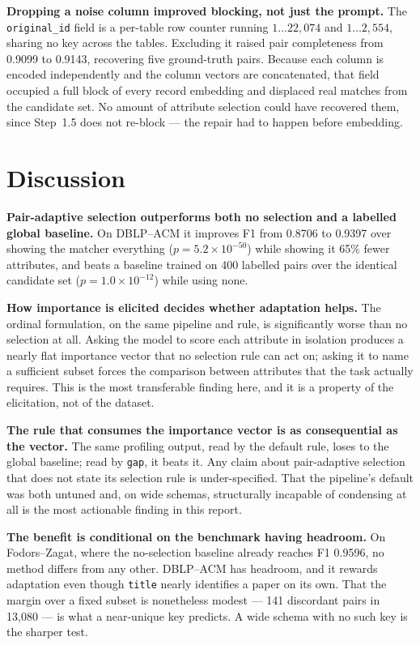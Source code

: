\documentclass[11pt]{article}
\begin{document}
\textbf{Dropping a noise column improved blocking, not just the prompt.} The
\texttt{original\_id} field is a per-table row counter running $1\ldots22{,}074$ and
$1\ldots2{,}554$, sharing no key across the tables. Excluding it raised pair completeness
from 0.9099 to 0.9143, recovering five ground-truth pairs. Because each column is encoded
independently and the column vectors are concatenated, that field occupied a full block of
every record embedding and displaced real matches from the candidate set. No amount of
attribute selection could have recovered them, since Step~1.5 does not re-block --- the
repair had to happen before embedding.

\section{Discussion}
\label{sec:discussion}

\textbf{Pair-adaptive selection outperforms both no selection and a labelled global
baseline.} On DBLP--ACM it improves F1 from 0.8706 to 0.9397 over showing the matcher
everything ($p = 5.2\times10^{-50}$) while showing it 65\% fewer attributes, and beats a
baseline trained on 400 labelled pairs over the identical candidate set
($p = 1.0\times10^{-12}$) while using none.

\textbf{How importance is elicited decides whether adaptation helps.} The ordinal
formulation, on the same pipeline and rule, is significantly worse than no selection at all.
Asking the model to score each attribute in isolation produces a nearly flat importance
vector that no selection rule can act on; asking it to name a sufficient subset forces the
comparison between attributes that the task actually requires. This is the most transferable
finding here, and it is a property of the elicitation, not of the dataset.

\textbf{The rule that consumes the importance vector is as consequential as the vector.} The
same profiling output, read by the default rule, loses to the global baseline; read by
\texttt{gap}, it beats it. Any claim about pair-adaptive selection that does not state its
selection rule is under-specified. That the pipeline's default was both untuned and, on wide
schemas, structurally incapable of condensing at all is the most actionable finding in this
report.

\textbf{The benefit is conditional on the benchmark having headroom.} On Fodors--Zagat, where
the no-selection baseline already reaches F1 0.9596, no method differs from any other.
DBLP--ACM has headroom, and it rewards adaptation even though \texttt{title} nearly
identifies a paper on its own. That the margin over a fixed subset is nonetheless modest ---
141 discordant pairs in 13{,}080 --- is what a near-unique key predicts. A wide schema with
no such key is the sharper test.
\end{document}
